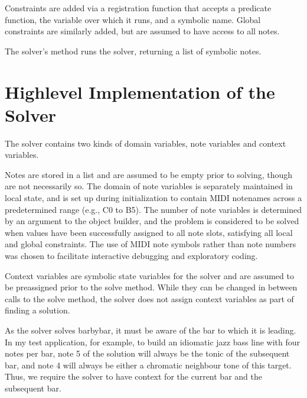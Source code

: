 \documentclass[letterpaper,10pt,english]{sphinxmanual}
\begin{document}
\sphinxAtStartPar
Constraints are added via a registration function that accepts a predicate function, the variable over which it runs,
and a symbolic name. Global constraints are similarly added, but are assumed to have access to all notes.

\sphinxAtStartPar
The solver’s  method runs the solver, returning a list of symbolic notes.


\chapter{High\sphinxhyphen{}level Implementation of the Solver}
\label{\detokenize{index:high-level-implementation-of-the-solver}}
\sphinxAtStartPar
The solver contains two kinds of domain variables, note variables and context variables.

\sphinxAtStartPar
Notes are stored in a list and are assumed to be empty prior to solving, though are not necessarily so.
The domain of note variables is separately maintained in local state, and is set up during initialization
to contain MIDI note\sphinxhyphen{}names across a pre\sphinxhyphen{}determined range (e.g., C0 to B5).
The number of note variables is determined by an argument to the object builder,
and the problem is considered to be solved when values have been successfully assigned to
all note slots, satisfying all local and global constraints.
The use of MIDI note symbols rather than note numbers was chosen to facilitate interactive
debugging and exploratory coding.

\sphinxAtStartPar
Context variables are symbolic state variables for the solver and are assumed to be
pre\sphinxhyphen{}assigned prior to the solve method. While they can be changed in between calls to the solve method,
the solver does not assign context variables as part of finding a solution.

\sphinxAtStartPar
As the solver solves bar\sphinxhyphen{}by\sphinxhyphen{}bar, it must be aware of the bar to which it is leading.
In my test application, for example, to build an idiomatic jazz bass line with four notes per bar,
note 5 of the solution will always be the tonic of the subsequent bar, and note
4 will always be either a chromatic neighbour tone of this target.
Thus, we require the solver to have context for the current bar and the subsequent bar.
\end{document}
